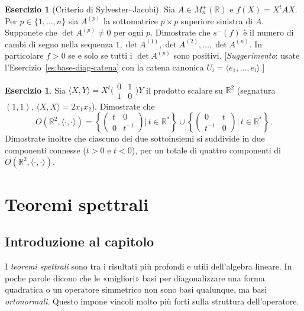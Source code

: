 \documentclass[11pt, a4paper]{book}
\theoremstyle{definition}
\newtheorem{esercizio}[definizione]{Esercizio}
\theoremstyle{plain}
\theoremstyle{remark}
\newcommand{\R}{\mathbb{R}}
\begin{document}
\begin{esercizio}[Criterio di Sylvester--Jacobi]
Sia $A \in M_n^+(\R)$ e $f(X) = X^tAX$. Per $p \in \{1,\ldots,n\}$ sia $A^{(p)}$ la sottomatrice $p\times p$ superiore sinistra di $A$. Supponete che $\det A^{(p)} \neq 0$ per ogni $p$. Dimostrate che $s^-(f)$ è il numero di cambi di segno nella sequenza $1,\det A^{(1)},\det A^{(2)},\ldots,\det A^{(n)}$. In particolare $f > 0$ se e solo se tutti i $\det A^{(p)}$ sono positivi. [\emph{Suggerimento}: usate l'Esercizio~\ref{es:base-diag-catena} con la catena canonica $U_i = \langle e_1,\ldots,e_i\rangle$.]
\end{esercizio}

\begin{esercizio}
Sia $\langle X,Y\rangle = X^t\bigl(\begin{smallmatrix}0&1\\1&0\end{smallmatrix}\bigr)Y$ il prodotto scalare su $\R^2$ (segnatura $(1,1)$, $\langle X,X\rangle = 2x_1x_2$). Dimostrate che
\[
  O(\R^2,\langle\cdot,\cdot\rangle) = \left\{\begin{pmatrix}t&0\\0&t^{-1}\end{pmatrix}\bigg|\,t\in\R^*\right\} \cup \left\{\begin{pmatrix}0&t\\t^{-1}&0\end{pmatrix}\bigg|\,t\in\R^*\right\}.
\]
Dimostrate inoltre che ciascuno dei due sottoinsiemi si suddivide in due componenti connesse ($t>0$ e $t<0$), per un totale di quattro componenti di $O(\R^2,\langle\cdot,\cdot\rangle)$.
\end{esercizio}


\chapter{Teoremi spettrali}
\label{cap:spettrale}

\section*{Introduzione al capitolo}

I \emph{teoremi spettrali} sono tra i risultati più profondi e utili dell'algebra lineare. In poche parole dicono che le «migliori» basi per diagonalizzare una forma quadratica o un operatore simmetrico non sono basi qualunque, ma basi \emph{ortonormali}. Questo impone vincoli molto più forti sulla struttura dell'operatore.
\end{document}
